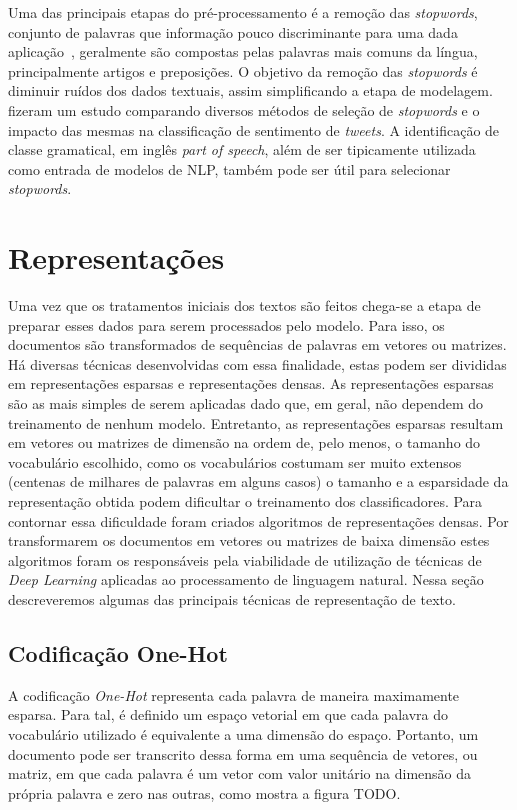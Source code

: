 Uma das principais etapas do pré-processamento é a remoção das
\textit{stopwords}, conjunto de palavras que informação pouco discriminante
para uma dada aplicação~\cite{lo05}, geralmente são compostas pelas palavras
mais comuns da língua, principalmente artigos e preposições.
O objetivo da remoção das \textit{stopwords} é diminuir ruídos dos dados
textuais, assim simplificando a etapa de modelagem.
\citet{saif14} fizeram um estudo comparando diversos métodos de seleção de
\textit{stopwords} e o impacto das mesmas na classificação de sentimento de
\textit{tweets}.
A identificação de classe gramatical, em inglês \textit{part of speech}, além de
ser tipicamente utilizada como entrada de modelos de NLP, também pode ser útil
para selecionar \textit{stopwords}.

\section{Representações}

Uma vez que os tratamentos iniciais dos textos são feitos chega-se a etapa de
preparar esses dados para serem processados pelo modelo.
Para isso, os documentos são transformados de sequências de palavras em vetores
ou matrizes.
Há diversas técnicas desenvolvidas com essa finalidade, estas podem ser
divididas em representações esparsas e representações densas.
As representações esparsas são as mais simples de serem aplicadas dado que, em
geral, não dependem do treinamento de nenhum modelo.
Entretanto, as representações esparsas resultam em vetores ou matrizes de
dimensão na ordem de, pelo menos, o tamanho do vocabulário escolhido, como os
vocabulários costumam ser muito extensos (centenas de milhares de palavras em
alguns casos) o tamanho e a esparsidade da representação obtida podem dificultar
o treinamento dos classificadores.
Para contornar essa dificuldade foram criados algoritmos de representações
densas.
Por transformarem os documentos em vetores ou matrizes de baixa dimensão estes
algoritmos foram os responsáveis pela viabilidade de utilização de técnicas de
\textit{Deep Learning} aplicadas ao processamento de linguagem natural.
Nessa seção descreveremos algumas das principais técnicas de representação de
texto.

\subsection{Codificação One-Hot}

A codificação \textit{One-Hot} representa cada palavra de maneira maximamente
esparsa.
Para tal, é definido um espaço vetorial em que cada palavra do vocabulário
utilizado é equivalente a uma dimensão do espaço.
Portanto, um documento pode ser transcrito dessa forma em uma sequência de
vetores, ou matriz, em que cada palavra é um vetor com valor unitário na
dimensão da própria palavra e zero nas outras, como mostra a figura TODO.

